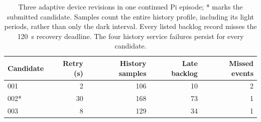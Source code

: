 \begin{table}[ht]
\centering\small
\setlength{\tabcolsep}{7pt}
\begin{tabular}{lrrrr}
\toprule
Candidate & Retry (s) & History samples & Late backlog & Missed events\\
\midrule
001 & 2 & 106 & 10 & 2 \\
002* & 30 & 168 & 73 & 1 \\
003 & 8 & 129 & 34 & 1 \\
\bottomrule
\end{tabular}
\caption{Three adaptive device revisions in one continued Pi episode; * marks the submitted candidate. Samples count the entire history profile, including its light periods, rather than only the dark interval. Every listed backlog record misses the 120~s recovery deadline. The four history service failures persist for every candidate.}
\label{tab:phase1-pi}
\end{table}
